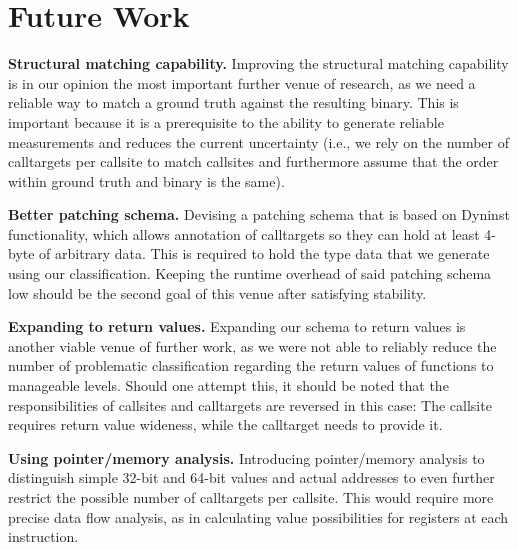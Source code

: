 \section{Future Work}
\label{chapter:Future_Work}
\textbf{Structural matching capability.} 
Improving the structural matching capability is in our opinion the most 
important further venue of research, as we need a reliable way to 
match a ground truth against the resulting binary. This is important 
because it is a prerequisite to the ability to generate reliable 
measurements and reduces the current uncertainty (i.e., we rely on the 
number of calltargets per callsite to match callsites and furthermore
assume that the order within ground truth and binary is the same).

\textbf{Better patching schema.} 
Devising a patching schema
that is based on Dyninst functionality, 
which allows annotation of calltargets so they can hold at least 
4-byte of arbitrary data. This is required to hold the type data that
we generate using our classification. Keeping the runtime overhead
of said patching schema low should be the second goal of this venue 
after satisfying stability.

\textbf{Expanding to return values.} 
Expanding our schema to return values
is another viable venue of further work, as we were not able to 
reliably reduce the number of problematic classification regarding 
the return values of functions to 
manageable levels. Should one attempt this, it should be noted that the
responsibilities of callsites and calltargets are reversed in this 
case: The callsite requires return value wideness, while the calltarget
needs to provide it.

\textbf{Using pointer/memory analysis.} 
Introducing pointer/memory analysis
to distinguish simple 32-bit and 64-bit values and actual addresses to even further restrict the 
possible number of calltargets per callsite. This would require more 
precise data flow analysis, as in calculating value possibilities for 
registers at each instruction.
